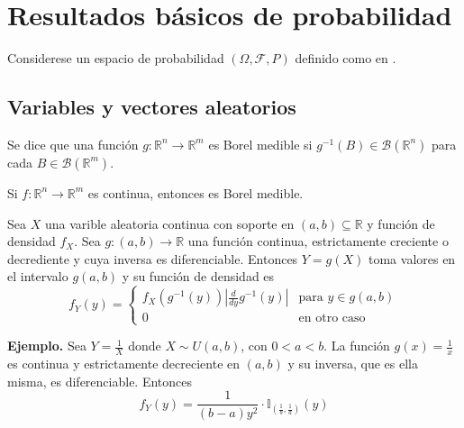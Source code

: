 \section{Resultados básicos de probabilidad}
\cite{billingsleyProbabilityMeasure1995}

Considerese un espacio de probabilidad $(\Omega,
\mathcal F, P)$ definido como en 
\cite{rinconCursoIntermedioProbabilidad2007}. 



\subsection{Variables y vectores aleatorios} 

\begin{definition}
    Se dice que una función $g:\mathbb R^n\to \mathbb R^m$  
    es Borel medible si $g^{-1}(B)\in \mathcal B(\mathbb R^n)$ para 
    cada $B\in \mathcal B(\mathbb R^m)$.
\end{definition}

\begin{proposition}
    Si $f:\mathbb R^n\to \mathbb R^m$ es continua, entonces es
    Borel medible.
\end{proposition}

\begin{theorem}
    Sea $X$ una varible aleatoria continua con soporte en 
    $(a,b)\subseteq \mathbb R$ y función de densidad $f_X$. Sea 
    $g:(a,b)\to \mathbb R$ una función continua, estrictamente 
    creciente o decrediente y cuya inversa es diferenciable. 
    Entonces $Y=g(X)$ toma valores en el intervalo $g(a,b)$ y 
    su función de densidad es 
    $$f_Y(y) = 
    \begin{cases}
    f_X(g^{-1}(y))\left|\frac{d}{dy}g^{-1}(y)\right| & \text{para } y\in g(a,b)\\
    0 & \text{en otro caso}
    \end{cases}$$
\end{theorem}

\noindent\textbf{Ejemplo.} Sea $Y=\frac{1}{X}$ donde $X\sim U(a,b)$, 
con $0<a<b$. La función $g(x) = \frac{1}{x}$ es continua y 
estrictamente decreciente en $(a,b)$ y su inversa, que es ella
misma, es diferenciable. Entonces 
$$f_Y(y) = \frac{1}{(b-a)y^2}
\cdot \mathbb I_{\left(\frac{1}{b},\frac{1}{a}\right)}(y)$$

